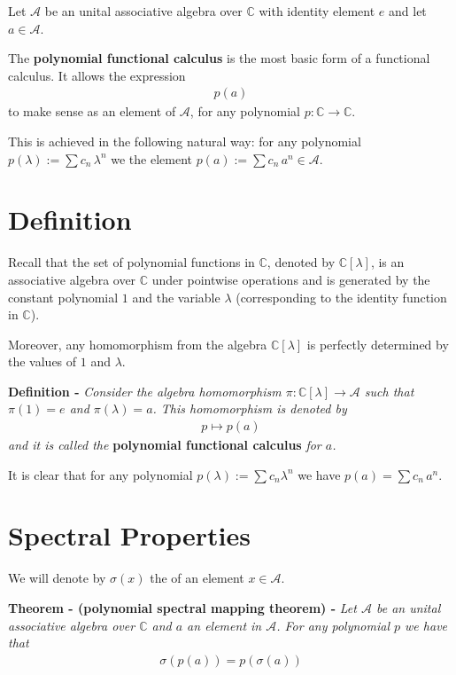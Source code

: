 \documentclass[12pt]{article}
\begin{document}

Let $\mathcal{A}$ be an unital associative algebra over $\mathbb{C}$ with identity element $e$ and let $a \in \mathcal{A}$.

The {\bf polynomial functional calculus} is the most basic form of a functional calculus. It allows the expression
\begin{align*}
p(a)
\end{align*}
to make sense as an element of $\mathcal{A}$, for any polynomial $p:\mathbb{C} \longrightarrow \mathbb{C}$.

This is achieved in the following natural way: for any polynomial $p(\lambda) := \sum c_n \, \lambda^n$ we  the element $p(a):= \sum c_n\, a^n \in \mathcal{A}$.

\section{Definition}

Recall that the set of polynomial functions in $\mathbb{C}$, denoted by $\mathbb{C}[\lambda]$, is an associative algebra over $\mathbb{C}$ under pointwise operations and is generated by the constant polynomial $1$ and the variable $\lambda$ (corresponding to the identity function in $\mathbb{C}$).

Moreover, any homomorphism from the algebra $\mathbb{C}[\lambda]$ is perfectly determined by the values of $1$ and $\lambda$.

{\bf Definition -} \emph{Consider the algebra homomorphism $\pi: \mathbb{C}[\lambda] \longrightarrow \mathcal{A}$ such that $\pi(1) = e$ and $\pi(\lambda) = a$. This homomorphism is denoted by}
\begin{align*}
p \longmapsto p(a)
\end{align*}
\emph{and it is called the} {\bf polynomial functional calculus} \emph{for $a$.}


It is clear that for any polynomial $p(\lambda) := \sum c_n \lambda^n$ we have $p(a) = \sum c_n\, a^n$.

\section{Spectral Properties}

We will denote by $\sigma(x)$ the  of an element $x \in \mathcal{A}$.


{\bf Theorem - (polynomial spectral mapping theorem) -} \emph{Let $\mathcal{A}$ be an unital associative algebra over $\mathbb{C}$ and $a$ an element in $\mathcal{A}$. For any polynomial $p$ we have that}
\begin{align*}
\sigma(p(a)) = p(\sigma(a))
\end{align*}
\end{document}
